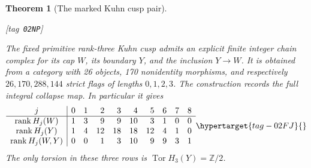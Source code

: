 \documentclass[11pt,a4paper]{article}
\numberwithin{equation}{section}
\newtheorem{theorem}{Theorem}[section]
\theoremstyle{definition}
\newcommand{\StatementRecord}[4]{{\upshape\footnotesize[tag~\texttt{#3}]}\enspace\ignorespaces}
\begin{document}
\begin{theorem}[The marked Kuhn cusp pair]\hypertarget{tag-02NP}{}\label{maps:src:F.2.34}
\StatementRecord{maps:src:F.2.34}{proved}{02NP}{\cref{maps:src:F.2.33}; \cite[Theorem 4.1.1 and Lemmas 4.1.2--4.1.3, pp.~480--482]{ffAchingerOgus20}; \cite[Theorem 8.7, pp.~57--59, and Corollary 8.8, p.~59, arXiv v1]{Yang2026}}


The fixed primitive rank-three Kuhn cusp admits an explicit
finite integer chain complex for its cap $W$, its boundary
$Y$, and the inclusion $Y\to W$.  It is obtained from a
category with 26 objects, 170 nonidentity morphisms, and
respectively $26,170,288,144$ strict flags of lengths
$0,1,2,3$.  The construction records the full integral
collapse map.  In particular it gives
\begin{equation}
\begin{array}{c|rrrrrrrrr}
j&0&1&2&3&4&5&6&7&8\\\hline
\operatorname{rank}H_j(W)&1&3&9&9&10&3&1&0&0\\
\operatorname{rank}H_j(Y)&1&4&12&18&18&12&4&1&0\\
\operatorname{rank}H_j(W,Y)&0&0&1&3&10&9&9&3&1
\end{array}                                                \hypertarget{tag-02FJ}{}\label{maps:eq:F.CK1}
\end{equation}
The only torsion in these three rows is
$\operatorname{Tor}H_3(Y)=\mathbb Z/2$.

\end{theorem}
\end{document}
